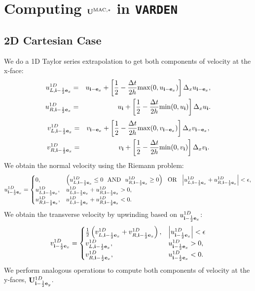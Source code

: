 \section{Computing ${\bf U}^{\rm MAC,*}$ in {\tt VARDEN}}

\subsection{2D Cartesian Case}
We do a 1D Taylor series extrapolation to get both components of velocity at the x-face:
\begin{eqnarray}
u_{L,{\bf i}-\frac{1}{2}{\bf e}_x}^{1D} &=& u_{{\bf i}-{\bf e}_x} + \left[\frac{1}{2} - \frac{\Delta t}{2h}{\rm max}(0,u_{{\bf i}-{\bf e}_x})\right]\Delta_xu_{{\bf i}-{\bf e}_x}, \label{varden U_L^1D} \\
u_{R,{\bf i}-\frac{1}{2}{\bf e}_x}^{1D} &=& u_{{\bf i}} + \left[\frac{1}{2} - \frac{\Delta t}{2h}{\rm min}(0,u_{{\bf i}})\right]\Delta_xu_{{\bf i}}.
\end{eqnarray}
\begin{eqnarray}
v_{L,{\bf i}-\frac{1}{2}{\bf e}_x}^{1D} &=& v_{{\bf i}-{\bf e}_x} + \left[\frac{1}{2} - \frac{\Delta t}{2h}{\rm max}(0,v_{{\bf i}-{\bf e}_x})\right]\Delta_xv_{{\bf i}-{\bf e}_x}, \\
v_{R,{\bf i}-\frac{1}{2}{\bf e}_x}^{1D} &=& v_{{\bf i}} + \left[\frac{1}{2} - \frac{\Delta t}{2h}{\rm min}(0,v_{{\bf i}})\right]\Delta_xv_{{\bf i}}.
\end{eqnarray}
We obtain the normal velocity using the Riemann problem:
\begin{equation}
u_{{\bf i}-\frac{1}{2}{\bf e}_x}^{1D} =
\begin{cases}
0, & \left(u_{L,{\bf i}-\frac{1}{2}{\bf e}_x}^{1D} \le 0 ~~ {\rm AND} ~~ u_{R,{\bf i}-\frac{1}{2}{\bf e}_x}^{1D} \ge 0\right) ~~ {\rm OR} ~~ \left|u_{L,{\bf i}-\frac{1}{2}{\bf e}_x}^{1D} + u_{R,{\bf i}-\frac{1}{2}{\bf e}_x}^{1D}\right| < \epsilon, \\
u_{L,{\bf i}-\frac{1}{2}{\bf e}_x}^{1D}, & u_{L,{\bf i}-\frac{1}{2}{\bf e}_x}^{1D} + u_{R,{\bf i}-\frac{1}{2}{\bf e}_x}^{1D} > 0, \\
u_{R,{\bf i}-\frac{1}{2}{\bf e}_x}^{1D}, & u_{L,{\bf i}-\frac{1}{2}{\bf e}_x}^{1D} + u_{R,{\bf i}-\frac{1}{2}{\bf e}_x}^{1D} < 0.
\end{cases}
\end{equation}
We obtain the transverse velocity by upwinding based on
$u_{{\bf i}-\frac{1}{2}{\bf e}_x}^{1D}$:
\begin{equation}
v_{{\bf i}-\frac{1}{2}{\bf e}_x}^{1D} =
\begin{cases}
\frac{1}{2}\left(v_{L,{\bf i}-\frac{1}{2}{\bf e}_x}^{1D} + v_{R,{\bf i}-\frac{1}{2}{\bf e}_x}^{1D}\right), & \left|u_{{\bf i}-\frac{1}{2}{\bf e}_x}^{1D}\right| < \epsilon \\
v_{L,{\bf i}-\frac{1}{2}{\bf e}_x}^{1D}, & u_{{\bf i}-\frac{1}{2}{\bf e}_x}^{1D} > 0, \\
v_{R,{\bf i}-\frac{1}{2}{\bf e}_x}^{1D}, & u_{{\bf i}-\frac{1}{2}{\bf e}_x}^{1D} < 0.
\end{cases}
\end{equation}
We perform analogous operations to compute both components of velocity
at the y-faces, ${\bf U}_{{\bf i}-\frac{1}{2}{\bf e}_y}^{1D}$. \\

